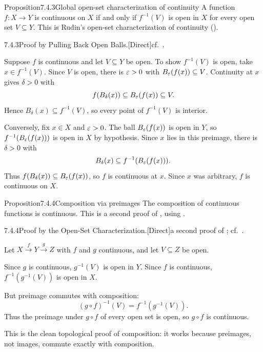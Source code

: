 \documentclass[main.tex]{subfiles}
\begin{document}
\begin{Obj}{Proposition}{7.4.3}{Global open-set characterization of continuity}
A function $f:X\to Y$ is continuous on $X$ if and only if $f^{-1}(V)$ is open in $X$ for every
open set $V\subseteq Y$.
This is Rudin's open-set characterization of continuity ().
\end{Obj}
\begin{Prf}{7.4.3}{Proof by Pulling Back Open Balls.}{[Direct]\quad cf.\ .}
\item Suppose $f$ is continuous and let $V\subseteq Y$ be open. To show $f^{-1}(V)$ is open, take
  $x\in f^{-1}(V)$. Since $V$ is open, there is $\varepsilon>0$ with
  $B_\varepsilon(f(x))\subseteq V$. Continuity at $x$ gives $\delta>0$ with
  \[
    f(B_\delta(x))\subseteq B_\varepsilon(f(x))\subseteq V.
  \]
  Hence $B_\delta(x)\subseteq f^{-1}(V)$, so every point of $f^{-1}(V)$ is interior.
\item Conversely, fix $x\in X$ and $\varepsilon>0$. The ball $B_\varepsilon(f(x))$ is open in $Y$, so
  $f^{-1}(B_\varepsilon(f(x)))$ is open in $X$ by hypothesis. Since $x$ lies in this preimage, there is
  $\delta>0$ with
  \[
    B_\delta(x)\subseteq f^{-1}(B_\varepsilon(f(x))).
  \]
  Thus $f(B_\delta(x))\subseteq B_\varepsilon(f(x))$, so $f$ is continuous at $x$. Since $x$ was
  arbitrary, $f$ is continuous on $X$.
\end{Prf}

\begin{Obj}{Proposition}{7.4.4}{Composition via preimages}
The composition of continuous functions is continuous.
This is a second proof of , using .
\end{Obj}
\begin{Prf}{7.4.4}{Proof by the Open-Set Characterization.}{[Direct]\quad a second proof of ; cf.\ .}
\item Let $X\xrightarrow{\,f\,}Y\xrightarrow{\,g\,}Z$ with $f$ and $g$ continuous, and let
  $V\subseteq Z$ be open.
\item Since $g$ is continuous, $g^{-1}(V)$ is open in $Y$. Since $f$ is continuous,
  $f^{-1}(g^{-1}(V))$ is open in $X$.
\item But preimage commutes with composition:
  \[
    (g\circ f)^{-1}(V)=f^{-1}(g^{-1}(V)).
  \]
  Thus the preimage under $g\circ f$ of every open set is open, so $g\circ f$ is continuous.
\end{Prf}

\noindent This is the clean topological proof of composition: it works because preimages, not
images, commute exactly with composition.
\end{document}
